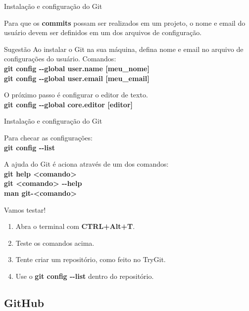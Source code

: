 \documentclass[a4paper]{beamer}
\begin{document}
\begin{frame}{Instalação e configuração do Git}

Para que os \textbf{commits} possam ser realizados em um projeto, o nome e email do usuário devem ser definidos em um dos arquivos de configuração.

\begin{block}{Sugestão}
Ao instalar o Git na sua máquina, defina nome e email no arquivo de configurações do usuário. Comandos:\\
\textbf{git config -{}-global user.name [meu\_nome]}\\
\textbf{git config -{}-global user.email [meu\_email]}
\end{block}
\pause

\vspace{10pt}
O próximo passo é configurar o editor de texto.\\
\textbf{git config -{}-global core.editor [editor]}

\end{frame}

\begin{frame}{Instalação e configuração do Git}

Para checar as configurações:\\
\textbf{git config -{}-list}
\pause

\vspace{10pt}
A ajuda do Git é aciona através de um dos comandos:\\
\textbf{git help <comando>}\\
\textbf{git <comando> -{}-help}\\
\textbf{man git-<comando>}
\pause

\vspace{10pt}
Vamos testar!
\begin{enumerate}
\item Abra o terminal com \textbf{CTRL+Alt+T}.
\item Teste os comandos acima.
\item Tente criar um repositório, como feito no TryGit.
\item Use o \textbf{git config -{}-list} dentro do repositório.
\end{enumerate}

\end{frame}

\subsection{GitHub}
\end{document}
